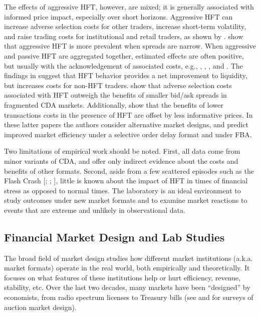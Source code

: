 The effects of aggressive HFT, however, are mixed; it is generally associated with informed price impact, especially over short horizons. Aggressive HFT can increase adverse selection costs for other traders, increase short-term volatility, and raise trading costs for institutional and retail traders, as shown by \cite{Brogaard2013, Zhang2011, Menkveld2015b}. \cite{Hendershott2013} show that aggressive HFT is more prevalent when spreads are narrow. When aggressive and passive HFT are aggregated together, estimated effects are often positive, but usually with the acknowledgement of associated costs, e.g., \cite{Brogaard2015a}, \cite{Hasbrouck2013}, \cite{Bershova2012}, and \cite{Breckenfelder2013}. The findings in \cite{Hirschey2013} suggest that HFT behavior provides a net improvement to liquidity, but increases costs for non-HFT traders. \cite{Baldauf2015a} show that adverse selection costs associated with HFT outweigh the benefits of smaller bid/ask spreads in fragmented CDA markets. Additionally, \cite{Baldauf2015} show that the benefits of lower transactions costs in the presence of HFT are offset by less informative prices. In these latter papers the authors consider alternative market designs, and predict improved market efficiency under a selective order delay format and under FBA.

Two limitations of empirical work should be noted. First, all data come from minor variants of CDA, and offer only indirect evidence about the costs and benefits of other formats. Second, aside from a few scattered episodes such as the Flash Crash [\cite{Aldrich2016}; \cite{Kirilenko2015}; \cite{Menkveld2015}], little is known about the impact of HFT in times of financial stress as opposed to normal times. The laboratory is an ideal environment to study outcomes under new market formats and to examine market reactions to events that are extreme and unlikely in observational data.

\subsection{Financial Market Design and Lab Studies}

The broad field of market design studies how different market institutions (a.k.a. market formats) operate in the real world, both empirically and theoretically. It focuses on what features of these institutions help or hurt efficiency, revenue, stability, etc. Over the last two decades, many markets have been “designed” by economists, from radio spectrum licenses to Treasury bills (see \cite{Klemperer2004} and \cite{Milgrom2011} for surveys of auction market design).


